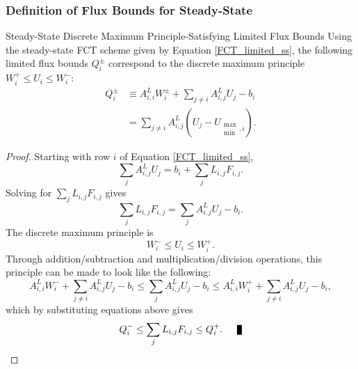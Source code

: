 \subsubsection{Definition of Flux Bounds for Steady-State}
\begin{theorem}{Steady-State Discrete Maximum Principle-Satisfying Limited
  Flux Bounds}
   Using the steady-state FCT scheme given by Equation \eqref{FCT_limited_ss},
   the following limited flux bounds $Q_i^\pm$ correspond to the discrete
   maximum principle $W_i^+\le U_i\le W_i^-$:
   \begin{equation}
   \begin{split}
      Q_i^\pm & \equiv A_{i,i}^L W_i^\pm + \sum\limits_{j\ne i} A_{i,j}^L U_j - b_i\\
      & = \sum\limits_{j\ne i}A_{i,j}^L(U_j - U_{\substack{\max\\\min},i}).
   \end{split}
   \end{equation}
\end{theorem}

\begin{proof}
   Starting with row $i$ of Equation \eqref{FCT_limited_ss},
   \[
      \sum\limits_j A_{i,j}^L U_j
      = b_i + \sum\limits_j L_{i,j}F_{i,j}.
   \]
   Solving for $\sum\limits_j L_{i,j}F_{i,j}$ gives
   \[
      \sum\limits_j L_{i,j}F_{i,j} =
      \sum\limits_j A_{i,j}^L U_j
      - b_i.
   \]
   The discrete maximum principle is
   \[
      W_i^-\le U_i\le W_i^+.
   \]
   Through addition/subtraction and multiplication/division operations, this
   principle can be made to look like the following:
   \[
   A_{i,i}^L W_i^- + \sum\limits_{j\ne i} A_{i,j}^L U_j - b_i
   \le \sum\limits_j A_{i,j}^L U_j - b_i
   \le A_{i,i}^L W_i^+ + \sum\limits_{j\ne i} A_{i,j}^L U_j - b_i,
   \]
   which by substituting equations above gives
   \[
      Q_i^-\le\sum\limits_j L_{i,j}F_{i,j}\le Q_i^+.\qed
   \]
\end{proof}
